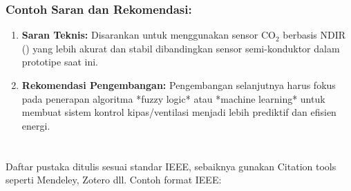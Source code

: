 \documentclass{elsinta}
\begin{document}
\subsubsection*{Contoh Saran dan Rekomendasi:}
\begin{enumerate}
    \item \textbf{Saran Teknis:} Disarankan untuk menggunakan sensor $\text{CO}_2$ berbasis $\text{NDIR}$ () yang lebih akurat dan stabil dibandingkan sensor semi-konduktor dalam prototipe saat ini.
    \item \textbf{Rekomendasi Pengembangan:} Pengembangan selanjutnya harus fokus pada penerapan algoritma *fuzzy logic* atau *machine learning* untuk membuat sistem kontrol kipas/ventilasi menjadi lebih prediktif dan efisien energi.
\end{enumerate}


\section{\ReferencesTitle}
Daftar pustaka ditulis sesuai standar IEEE, sebaiknya gunakan Citation tools seperti Mendeley, Zotero dll.  
Contoh format IEEE:  
\renewcommand{\refname}{} 

\section{\AbbrevTitle}
\end{document}
